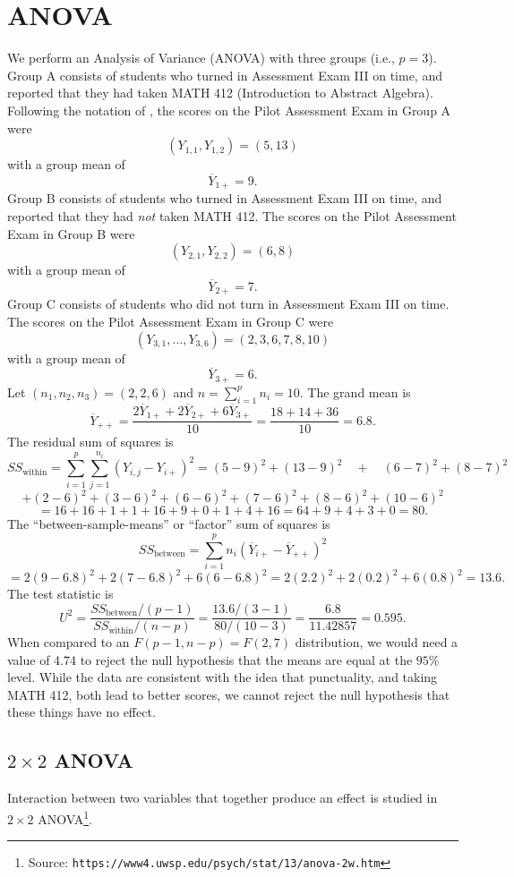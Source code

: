 \section{ANOVA}
We perform an Analysis of Variance (ANOVA) with three groups (i.e., $p=3$). Group A consists of students who turned in Assessment Exam III on time, and reported that they had taken MATH 412 (Introduction to Abstract Algebra). Following the notation of , the scores on the Pilot Assessment Exam in Group A were
\[
	(Y_{1,1},Y_{1,2}) = (5, 13)
\]
with a group mean of
\[
	\overline Y_{1+} = 9.
\]
Group B consists of students who turned in Assessment Exam III on time, and reported that they had \emph{not} taken MATH 412.
The scores on the Pilot Assessment Exam in Group B were
\[
	(Y_{2,1},Y_{2,2}) = (6, 8)
\]
with a group mean of
\[
	\overline Y_{2+} = 7.
\]
Group C consists of students who did not turn in Assessment Exam III on time.
The scores on the Pilot Assessment Exam in Group C were
\[
	(Y_{3,1},\dots,Y_{3,6}) = (2, 3, 6, 7, 8, 10)
\]
with a group mean of
\[
	\overline Y_{3+} = 6.
\]
Let $(n_1,n_2,n_3)=(2,2,6)$ and $n=\sum_{i=1}^p n_i=10$.
The grand mean is
\[
	\overline Y_{++} = \frac{2\overline Y_{1+}+2\overline Y_{2+}+6\overline Y_{3+}}{10} = \frac{18+14+36}{10} = 6.8.
\]
The residual sum of squares is
\[
	SS_{\text{within}} = \sum_{i=1}^p \sum_{j=1}^{n_i}(Y_{i,j}-Y_{i+})^2 = (5-9)^2+(13-9)^2\quad +\quad (6-7)^2+(8-7)^2
\]
\[
	+ (2-6)^2+(3-6)^2+(6-6)^2+(7-6)^2+(8-6)^2+(10-6)^2
\]
\[
	= 16+16+1+1+16+9+0+1+4+16 = 64+9+4+3+0 = 80.
\]
The ``between-sample-means'' or ``factor'' sum of squares is
\[
	SS_{\text{between}} = \sum_{i=1}^p n_i(\overline Y_{i+}-\overline Y_{++})^2
\]
\[
	= 2(9-6.8)^2 + 2(7-6.8)^2 + 6(6-6.8)^2 = 2(2.2)^2+2(0.2)^2+6(0.8)^2 = 13.6.
\]
The test statistic is
\[
	U^2 = \frac{SS_{\text{between}}/(p-1)}{SS_{\text{within}}/(n-p)} = \frac{13.6/(3-1)}{80/(10-3)} = \frac{6.8}{11.42857} = 0.595.
\]
When compared to an $F(p-1,n-p)=F(2,7)$ distribution, we would need a value of 4.74 to reject the null hypothesis that the means are equal at the $95\%$ level.
While the data are consistent with the idea that punctuality, and taking MATH 412, both lead to better scores, we cannot reject the null hypothesis that these things have no effect.

\subsection{$2\times 2$ ANOVA}
Interaction between two variables that together produce an effect is studied in $2\times 2$ ANOVA\footnote{Source: \texttt{https://www4.uwsp.edu/psych/stat/13/anova-2w.htm}}.


